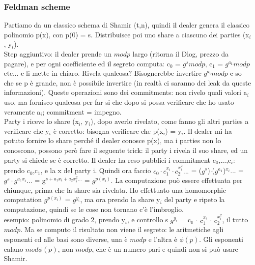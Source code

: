 \documentclass[16px]{article}
\begin{document}
\subsubsection{Feldman scheme}
Partiamo da un classico schema di Shamir (t,n), quindi il dealer genera il classico polinomio p(x), con p(0) = s. Distribuisce poi uno share a ciascuno dei parties (x$_i$, y$_i$).\\ Step aggiuntivo: il dealer prende un $modp$ largo (ritorna il Dlog, prezzo da pagare), e per ogni coefficiente ed il segreto computa: c$_0$ = $g^smodp$, c$_1$ = $g^{a_1}modp$ etc... e li mette in chiaro. Rivela qualcosa? Bisognerebbe invertire $g^{a_i}modp$ e so che se p è grande, non è possibile invertire (in realtà ci saranno dei leak da queste informazioni). Queste operazioni sono dei commitments: non rivelo quali valori a$_i$ uso, ma fornisco qualcosa per far si che dopo si possa verificare che ho usato veramente a$_i$; commitment = impegno.\\ Party i riceve lo share (x$_i$, y$_i$), dopo averlo rivelato, come fanno gli altri parties a verificare che y$_i$ è corretto: bisogna verificare che p(x$_i$) = y$_i$. Il dealer mi ha potuto fornire lo share perché il dealer conosce p(x), ma i parties non lo conoscono, possono però fare il seguente trick: il party i rivela il suo share, ed un party si chiede se è corretto. Il dealer ha reso pubblici i commitment c$_0$,...,c$_i$:\\ prendo c$_0$,c$_1$, e la x del party i. Quindi ora faccio $c_0 \cdot c_1^{x_i} \cdot c_2^{x_i^2}...$ = ($g^s$)$\cdot$($g^{a_1}$)$^{x_i}$... = $g^s \cdot g^{a_1x_i}$... = g$^{s + a_1x_i + a_2x_i^2...}$ = $g^{p(x_i)}$. La computazione può essere effettuata per chiunque, prima che la share sia rivelata. Ho effettuato una homomorphic computation $g^{p(x_i)}$ = $g^{y_i}$, ma ora prendo la share y$_i$ del party e ripeto la computazione, quindi se le cose non tornano c'è l'imbroglio.\\ esempio: polinomio di grado 2, prendo y$_i$, e controllo s $g^{y_i}$ = c$_0$ $\cdot$ $c_1^{x_i}$ $\cdot$ $c_2^{x_i^2}$, il tutto $modp$. Ma se computo il risultato non viene il segreto: le aritmetiche agli esponenti ed alle basi sono diverse, una è $modp$ e l'altra è $\phi(p)$. Gli esponenti calano $mod\phi(p)$, non $modp$, che è un numero pari e quindi non si può usare Shamir.
\end{document}

